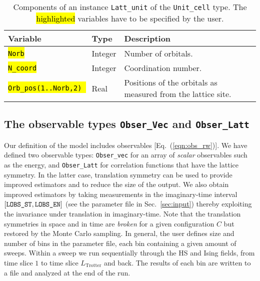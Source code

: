 \begin{table}[h]
   \begin{tabular}{@{} l l l @{}}\toprule
    Variable  & Type & Description \\\midrule
     \hl{\texttt{Norb}}   & Integer    & Number of orbitals.  \\
      \hl{\texttt{N\_coord}} & Integer & Coordination number.  \\
       \hl{\texttt{Orb\_pos(1..Norb,2) }} & Real & Positions of the orbitals as measured from the lattice site.  \\\bottomrule
   \end{tabular}
     \caption{Components of an instance \texttt{Latt\_unit} of the \texttt{Unit\_cell} type.
   The \hl{highlighted} variables have to be specified by the user. } 
    \label{table:unit_cell}
\end{table}


\subsection{The observable types \texttt{Obser\_Vec} and \texttt{Obser\_Latt}}\label{sec:obs}

Our definition  of the model includes observables [Eq.~(\ref{eqn:obs_rw})]. We have defined two observable types: \texttt{Obser\_vec}  for an array of \emph{scalar} observables
such as the energy, and  \texttt{Obser\_Latt}   for correlation functions that have the lattice symmetry. In the latter case, translation symmetry can be used to provide improved estimators and to reduce the size of the output.   
We also obtain improved estimators by taking measurements in the imaginary-time interval $[\texttt{LOBS\_ST},\texttt{LOBS\_EN\texttt{}}]$ (see the parameter file in Sec.~\ref{sec:input}) thereby exploiting the invariance under translation in imaginary-time.
Note that the translation symmetries  in space and in time are \emph{broken} for a given  configuration $C$ but restored by the Monte Carlo sampling. 
In general, the user defines size and number of bins in the parameter file, each bin containing a given amount of sweeps. Within a sweep we run sequentially through the HS and Ising fields, from time slice $1$ to time slice $L_{\text{Trotter}}$ and back.  The results of each bin are written to a file  and analyzed at the end of the run.     

